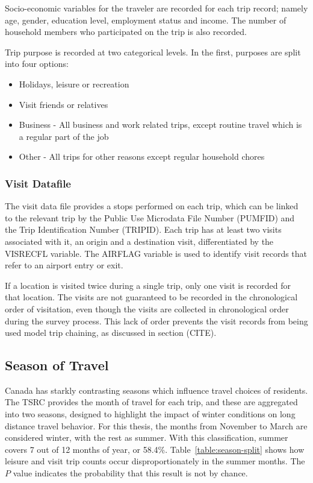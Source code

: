 Socio-economic variables for the traveler are recorded for each trip record; namely age, gender, education level, employment status and income. The number of household members who participated on the trip is also recorded.

Trip purpose is  recorded at two categorical levels. In the first, purposes are split into four options:
\begin{itemize}
\item Holidays, leisure or recreation
\item Visit friends or relatives
\item Business - All business and work related trips, except routine travel which is a regular part of the job
\item Other - All trips for other reasons except regular household chores
\end{itemize}

\subsubsection{Visit Datafile}
The visit data file provides a stops performed on each trip, which can be linked to the relevant trip by the Public Use Microdata File Number (PUMFID) and the Trip Identification Number (TRIPID). Each trip has at least two visits associated with it, an origin and a destination visit, differentiated by the VISRECFL variable. The AIRFLAG variable is used to identify visit records that refer to an airport entry or exit. 

If a location is visited twice during a single trip, only one visit is recorded for that location. The visits are not guaranteed to be recorded in the chronological order of visitation, even though the visits are collected in chronological order during the survey process. This lack of order prevents the visit records from being used model trip chaining, as discussed in section (CITE).

\subsection{Season of Travel}
Canada has starkly contrasting seasons which influence travel choices of residents. The TSRC provides the month of travel for each trip, and these are aggregated into two seasons, designed to highlight the impact of winter conditions on long distance travel behavior. For this thesis, the months from November to March are considered winter, with the rest as summer. With this classification, summer covers 7 out of 12 months of year, or 58.4\%. Table~\ref{table:season-split} shows how leisure and visit trip counts occur disproportionately in the summer months. The $P$ value indicates the probability that this result is not by chance.

